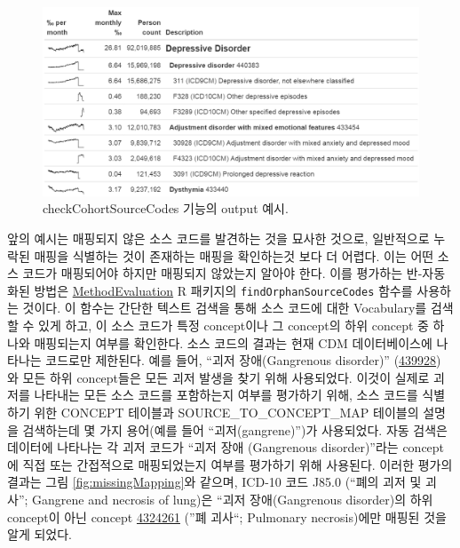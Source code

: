 \documentclass[10.5pt]{book}
\theoremstyle{definition}
\theoremstyle{definition}
\theoremstyle{definition}
\theoremstyle{remark}
\begin{document}
\begin{figure}

{\centering \includegraphics[width=1\linewidth]{images/DataQuality/sourceCodes} 

}

\caption{checkCohortSourceCodes 기능의 output 예시. }\label{fig:sourceCodes}
\end{figure}

앞의 예시는 매핑되지 않은 소스 코드를 발견하는 것을 묘사한 것으로,
일반적으로 누락된 매핑을 식별하는 것이 존재하는 매핑을 확인하는것 보다
더 어렵다. 이는 어떤 소스 코드가 매핑되어야 하지만 매핑되지 않았는지
알아야 한다. 이를 평가하는 반-자동화된 방법은
\href{https://ohdsi.github.io/MethodEvaluation/}{MethodEvaluation} R
패키지의 \texttt{findOrphanSourceCodes} 함수를 사용하는 것이다. 이
함수는 간단한 텍스트 검색을 통해 소스 코드에 대한 Vocabulary를 검색할 수
있게 하고, 이 소스 코드가 특정 concept이나 그 concept의 하위 concept 중
하나와 매핑되는지 여부를 확인한다. 소스 코드의 결과는 현재 CDM
데이터베이스에 나타나는 코드로만 제한된다. 예를 들어, ``괴저
장애(Gangrenous disorder)''
(\href{http://athena.ohdsi.org/search-terms/terms/439928}{439928}) 와
모든 하위 concept들은 모든 괴저 발생을 찾기 위해 사용되었다. 이것이
실제로 괴저를 나타내는 모든 소스 코드를 포함하는지 여부를 평가하기 위해,
소스 코드를 식별하기 위한 CONCEPT 테이블과 SOURCE\_TO\_CONCEPT\_MAP
테이블의 설명을 검색하는데 몇 가지 용어(예를 들어 ``괴저(gangrene)'')가
사용되었다. 자동 검색은 데이터에 나타나는 각 괴저 코드가 ``괴저 장애
(Gangrenous disorder)''라는 concept에 직접 또는 간접적으로 매핑되었는지
여부를 평가하기 위해 사용된다. 이러한 평가의 결과는 그림
\ref{fig:missingMapping}와 같으며, ICD-10 코드 J85.0 (``폐의 괴저 및
괴사''; Gangrene and necrosis of lung)은 ``괴저 장애(Gangrenous
disorder)의 하위 concept이 아닌 concept
\href{http://athena.ohdsi.org/search-terms/terms/4324261}{4324261} (''폐
괴사``; Pulmonary necrosis)에만 매핑된 것을 알게 되었다.
\end{document}
